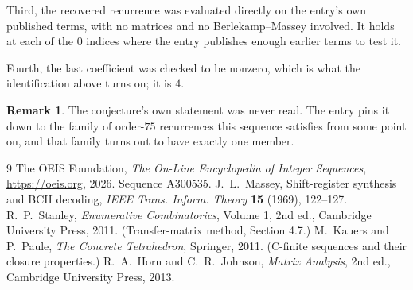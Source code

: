 \documentclass[11pt,a4paper]{article}
\theoremstyle{plain}
\theoremstyle{definition}
\newtheorem{remark}[theorem]{Remark}
\begin{document}
Third, the recovered recurrence was evaluated directly on the entry's own published terms, with
no matrices and no Berlekamp--Massey involved. It holds at each of the $0$ indices where
the entry publishes enough earlier terms to test it.

Fourth, the last coefficient was checked to be nonzero, which is what the identification above
turns on; it is $4$.

\begin{remark}
The conjecture's own statement was never read. The entry pins it down to the family of
order-$75$ recurrences this sequence satisfies from some point on, and that family turns
out to have exactly one member.
\end{remark}

\begin{thebibliography}{9}
 The OEIS Foundation, \emph{The On-Line Encyclopedia of Integer
Sequences}, \url{https://oeis.org}, 2026. Sequence A300535.
 J.~L.~Massey, Shift-register synthesis and BCH decoding, \emph{IEEE
Trans. Inform. Theory} \textbf{15} (1969), 122--127.
 R.~P.~Stanley, \emph{Enumerative Combinatorics}, Volume 1, 2nd ed.,
Cambridge University Press, 2011. (Transfer-matrix method, Section 4.7.)
 M.~Kauers and P.~Paule, \emph{The Concrete Tetrahedron}, Springer, 2011.
(C-finite sequences and their closure properties.)
 R.~A.~Horn and C.~R.~Johnson, \emph{Matrix Analysis}, 2nd ed., Cambridge
University Press, 2013.
\end{thebibliography}
\end{document}
